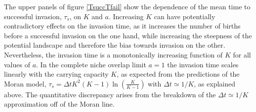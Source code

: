 \iffalse
\begin{figure}[ht!]
	\centering
	\begin{minipage}{0.49\linewidth}
		\centering
		\texttt{[image: fiftyfifty-invtimevK.pdf]}
	\end{minipage}
	\begin{minipage}{0.49\linewidth}
		\centering
		\texttt{[image: fiftyfifty-invtimeva.pdf]}
	\end{minipage}
	\caption{\emph{Mean time of a successful invasion.}
		\emph{Left:} Solid lines are the numerical results, from $a=0$ at the bottom to $a=1$ at top. The blue dashed line shows for comparison the predictions of the Moran model in the complete niche overlap limit, $a=1$; see text. The black line correspond to the solution of an independent stochastic logistic species, $a=0$.
		\emph{Right:} The solid red line shows the results for small carrying capacity ($K=4$), and successive lines are at larger system size, up to $K=256$. The dashed blue line is $1/(b_{mut}+d_{mut})$ and matches with small $K$.
	} \label{Tsucc}
\end{figure}
\fi
The upper panels of figure \ref{TsuccTfail} show the dependence of the mean time to successful invasion, $\tau_s$, on $K$ and $a$. 
Increasing $K$ can have potentially contradictory effects on the invasion time, as it increases the number of births before a successful invasion on the one hand, while increasing the steepness of the potential landscape and therefore the bias towards invasion on the other. %
Nevertheless, the invasion time is a monotonically increasing function of $K$ for all values of $a$. 
In the complete niche overlap limit $a=1$ the invasion time scales linearly with the carrying capacity $K$, as expected from the predictions of the Moran model, $\tau_{s} = \Delta t K^2(K-1)\ln\left(\frac{K}{K-1}\right)$ with $\Delta t\simeq 1/K$, as explained above. %
The quantitative discrepancy arises from the breakdown of the $\Delta t\simeq 1/K$ approximation off of the Moran line. %
